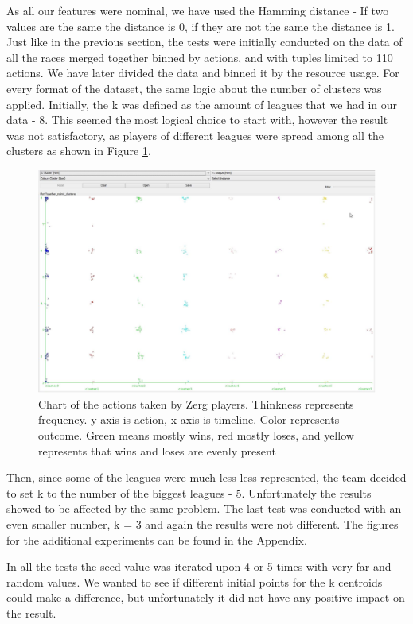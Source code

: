 \documentclass[a4paper,11pt]{article}
\begin{document}
As all our features were nominal, we have used the Hamming distance - If two values are the same the distance is 0, if they are not the same the distance is 1.
Just like in the previous section, the tests were initially conducted on the data of all the races merged together binned by actions, and with tuples limited to 110 actions. We have later divided the data and binned it by the resource usage.
For every format of the dataset, the same logic about the number of clusters was applied. Initially, the k was defined as the amount of leagues that we had in our data - 8. This seemed the most logical choice to start with, however the result was not satisfactory, as players of different leagues were spread among all the clusters as shown in Figure \ref{fig:cluster-8}.
\begin{figure}[H]
\centering
  \includegraphics[width=.95\linewidth]{cluster-8}
\caption{Chart of the actions taken by Zerg players. Thinkness represents frequency. y-axis is action, x-axis is timeline. Color represents outcome. Green means mostly wins, red mostly loses, and yellow represents that wins and loses are evenly present}
\label{fig:cluster-8}
\end{figure}

Then, since some of the leagues were much less less represented, the team decided to set k to the number of the biggest leagues - 5. Unfortunately the results showed to be affected by the same problem.
The last test was conducted with an even smaller number, k = 3 and again the results were not different. The figures for the additional experiments can be found in the Appendix.

In all the tests the seed value was iterated upon 4 or 5 times with very far and random values. We wanted to see if different initial points for the k centroids could make a difference, but unfortunately it did not have any positive impact on the result.
\end{document}
